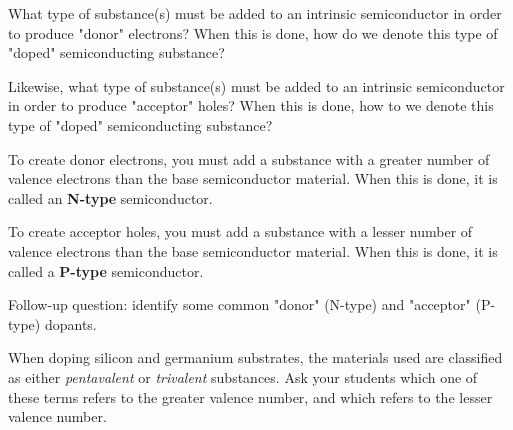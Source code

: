 

What type of substance(s) must be added to an intrinsic semiconductor in order to produce "donor" electrons?  When this is done, how do we denote this type of "doped" semiconducting substance?

Likewise, what type of substance(s) must be added to an intrinsic semiconductor in order to produce "acceptor" holes?  When this is done, how to we denote this type of "doped" semiconducting substance?







To create donor electrons, you must add a substance with a greater number of valence electrons than the base semiconductor material.  When this is done, it is called an {\bf N-type} semiconductor.

To create acceptor holes, you must add a substance with a lesser number of valence electrons than the base semiconductor material.  When this is done, it is called a {\bf P-type} semiconductor.

\vskip 10pt

Follow-up question: identify some common "donor" (N-type) and "acceptor" (P-type) dopants.







When doping silicon and germanium substrates, the materials used are classified as either {\it pentavalent} or {\it trivalent} substances.  Ask your students which one of these terms refers to the greater valence number, and which refers to the lesser valence number.




